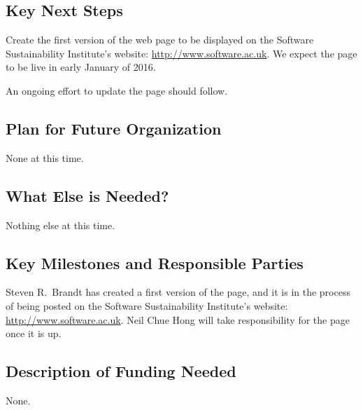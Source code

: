 \subsection{Key Next Steps}

Create the first version of the web page to be displayed on the Software
Sustainability Institute's website: \url{http://www.software.ac.uk}.
We expect the page to be live in early January of 2016.

An ongoing effort to update the page should follow.

\subsection{Plan for Future Organization}

None at this time.

\subsection{What Else is Needed?}

Nothing else at this time.

\subsection{Key Milestones and Responsible Parties}

Steven R.\ Brandt has created a first version of the page, and it is in the process
of being posted on the Software
Sustainability Institute's website: \url{http://www.software.ac.uk}. 
Neil Chue Hong will take responsibility for the page once it is up.

\subsection{Description of Funding Needed}

None.

